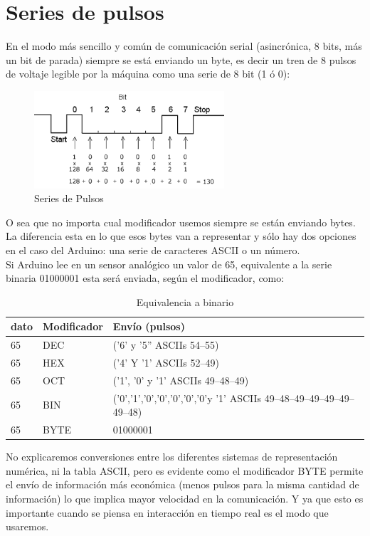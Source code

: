 \section{Series de pulsos}
En el modo más sencillo y común de comunicación serial (asincrónica, 8 bits, más un bit de parada) siempre se está enviando un byte, es decir un tren de 8 pulsos de voltaje legible por la máquina como una serie de 8 bit (1 ó 0):

\begin{figure}[!htp]
	\centering
	\includegraphics[width=200pt]{./Imagenes/Documentos/ArduinoNotebook_img12.png}
	\caption[Series de pulsos]{Series de Pulsos}
\end{figure}
O sea que no importa cual modificador usemos siempre se están enviando bytes. La diferencia esta en lo que esos bytes van a representar y sólo hay dos opciones en el caso del Arduino: una serie de caracteres ASCII o un número.\\
Si Arduino lee en un sensor analógico un valor de 65, equivalente a la serie binaria 01000001 esta será enviada, según el modificador, como:
\begin{table}[!htp]
	\begin{tabular}{|l|l|l|}
		\hline
		dato & Modificador    &     Envío (pulsos) \\
		\hline
		65  &  DEC  & ('6' y '5'' ASCIIs 54–55)\\
		\hline
		65  &  HEX  & ('4' Y '1' ASCIIs 52–49)\\
		\hline  
		65  &  OCT  & ('1', '0' y '1' ASCIIs 49–48–49)\\
		\hline 
		65  &  BIN  & ('0','1','0','0','0','0','0'y '1'   ASCIIs 49–48–49–49–49–49–49–48)\\
		\hline
		65  &  BYTE & 01000001 \\
		\hline
     \end{tabular}
	 \caption{Equivalencia a binario}
\end{table}
No explicaremos conversiones entre los diferentes sistemas de representación numérica, ni la tabla ASCII, pero es evidente como el modificador BYTE permite el envío de información más económica (menos pulsos para la misma cantidad de información) lo que implica mayor velocidad en la comunicación. Y ya que esto es importante cuando se piensa en interacción en tiempo real es el modo que usaremos.

